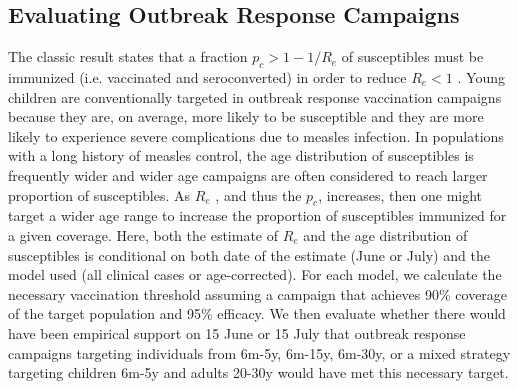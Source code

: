 \subsection{Evaluating Outbreak Response Campaigns}\label{ori}

The classic result states that a fraction \(p_c \gt 1-1/R_e\) of susceptibles must be immunized (i.e. vaccinated and seroconverted) in order to reduce \(R_e \lt 1\) \cite{Anderson_1981}. Young children are conventionally targeted in outbreak response vaccination campaigns because they are, on average, more likely to be susceptible and they are more likely to experience severe complications due to measles infection. In populations with a long history of measles
control, the age distribution of susceptibles is frequently wider \cite{23798689} and wider age campaigns are often considered to reach larger proportion of susceptibles. As \(R_e\) , and thus the \(p_c\), increases, then one might target a wider age range to increase the proportion of susceptibles immunized for a given coverage. Here, both the estimate of \(R_e\) and the age distribution of susceptibles is conditional on both date of the estimate (June or July) and the model used (all clinical cases or age-corrected). For each model, we calculate the necessary vaccination threshold assuming a campaign that achieves 90\% coverage of the target population and 95\% efficacy. We then evaluate whether there would have been empirical support on 15 June or 15 July that outbreak response campaigns targeting individuals from 6m-5y, 6m-15y, 6m-30y, or a mixed strategy targeting children 6m-5y and adults 20-30y would have met this necessary target.